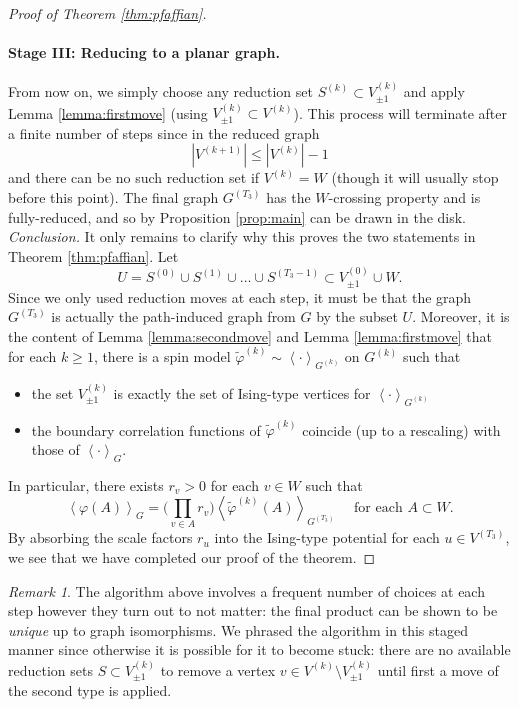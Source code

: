 \documentclass{article}
\numberwithin{equation}{section}
\theoremstyle{definition}
\theoremstyle{definition}
\theoremstyle{remark}
\newtheorem{remark}{Remark}
\newcommand\vp{\varphi}
\newcommand{\Vis}{V_{\mathrm{Ising}}}
\renewcommand{\Vis}{V_{\pm 1}}
\renewcommand{\k}[1]{{#1}^{(k)}}
\begin{document}
\begin{proof}[Proof of Theorem \ref{thm:pfaffian}]
	\paragraph{Stage III: Reducing to a planar graph.}
	From now on, we simply choose any reduction set $S^{(k)} \subset \Vis^{(k)}$ and apply Lemma \ref{lemma:firstmove} (using $\Vis^{(k)} \subset \k{V}$). This process will terminate after a finite number of steps since in the reduced graph 
	\[
		|V^{(k+1)}| \leq |V^{(k)}| -  1
	\] 
	and there can be no such reduction set if $V^{(k)} = W$ (though it will usually stop before this point). The final graph $G^{(T_3)}$ has the $W$-crossing property and is fully-reduced, and so by Proposition \ref{prop:main} can be drawn in the disk. 
	\\[1em]
	\noindent\emph{Conclusion.} It only remains to clarify why this proves the two statements in Theorem \ref{thm:pfaffian}. Let 
	\[
		U = S^{(0)} \cup S^{(1)} \cup \ldots \cup S^{(T_3 - 1)} \subset \Vis^{(0)} \cup W.
	\] 
	Since we only used reduction moves at each step, it must be that the graph $G^{(T_3)}$ is actually the path-induced graph from $G$ by the subset $U$. Moreover, it is the content of Lemma \ref{lemma:secondmove} and Lemma \ref{lemma:firstmove} that for each $k \geq 1$, there is a spin model $ \widetilde{\vp}^{(k)} \sim \left< \cdot \right>_{\k{G}}$ on $\k{G}$ such that
\begin{itemize}
	\item the set $\Vis^{(k)}$ is exactly the set of Ising-type vertices for $\left< \cdot \right>_{\k{G}}$
	\item the boundary correlation functions of $ \widetilde{\vp}^{(k)}$ coincide (up to a rescaling) with those of $\left< \cdot \right>_{G}$. 
\end{itemize}
	In particular, there exists $r_v > 0$ for each $v \in W$ such that
	\[
		\left< \vp(A) \right>_{G} =\Big ( \prod_{v \in A} r_v\Big) \left< \widetilde{\vp}^{(k)}(A) \right>_{G^{(T_3)}} \quad \text{ for each $A \subset W$}.
	\] 
	By absorbing the scale factors $r_u$ into the Ising-type potential for each $u \in V^{(T_3)}$, we see that we have completed our proof of the theorem.
\end{proof}

\begin{remark}
	The algorithm above involves a frequent number of choices at each step however they turn out to not matter: the final product can be shown to be \emph{unique} up to graph isomorphisms. 
	We phrased the algorithm in this staged manner since otherwise it is possible for it to become stuck: there are no available reduction sets $S \subset \Vis^{(k)}$ to remove a vertex $v \in \k{V} \setminus \Vis^{(k)}$ until first a move of the second type is applied.
\end{remark}
\end{document}
